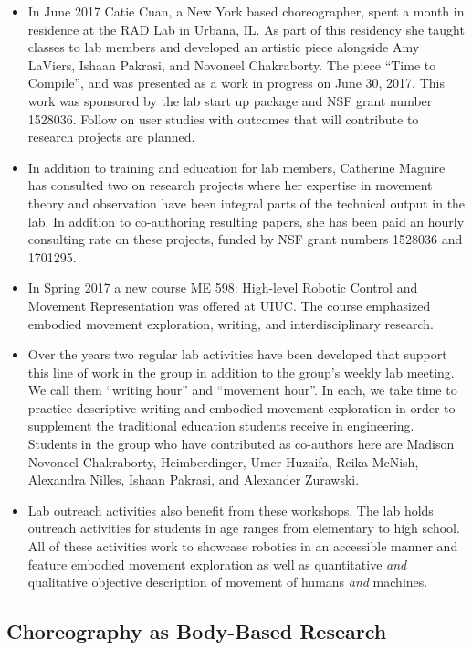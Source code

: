 \documentclass[arts,article,submit,moreauthors,pdftex,10pt,a4paper]{mdpi}
\begin{document}
\begin{itemize}
\item In June 2017 Catie Cuan, a New York based choreographer, spent a month in residence at the RAD Lab in Urbana, IL.  As part of this residency she taught classes to lab members and developed an artistic piece alongside Amy LaViers, Ishaan Pakrasi, and Novoneel Chakraborty.  The piece ``Time to Compile”, and was presented as a work in progress on June 30, 2017.  This work was sponsored by the lab start up package and NSF grant number 1528036.  Follow on user studies with outcomes that will contribute to research projects are planned.
\item In addition to training and education for lab members, Catherine Maguire has consulted two on research projects where her expertise in movement theory and observation have been integral parts of the technical output in the lab.  In addition to co-authoring resulting papers, she has been paid an hourly consulting rate on these projects, funded by NSF grant numbers 1528036 and 1701295. 
\item In Spring 2017 a new course ME 598: High-level Robotic Control and Movement Representation was offered at UIUC.  The course emphasized embodied movement exploration, writing, and interdisciplinary research.
\item Over the years two regular lab activities have been developed that support this line of work in the group in addition to the group's weekly lab meeting.  We call them ``writing hour'' and ``movement hour''.  In each, we take time to practice descriptive writing and embodied movement exploration in order to supplement the traditional education students receive in engineering.  Students in the group who have contributed as co-authors here are Madison Novoneel Chakraborty, Heimberdinger, Umer Huzaifa, Reika McNish, Alexandra Nilles, Ishaan Pakrasi, and Alexander Zurawski.
\item Lab outreach activities also benefit from these workshops.  The lab holds outreach activities for students in age ranges from elementary to high school.  All of these activities work to showcase robotics in an accessible manner and feature embodied movement exploration as well as quantitative \textit{and} qualitative objective description of movement of humans \textit{and} machines.
\end{itemize}

\subsection{Choreography as Body-Based Research}
\end{document}
